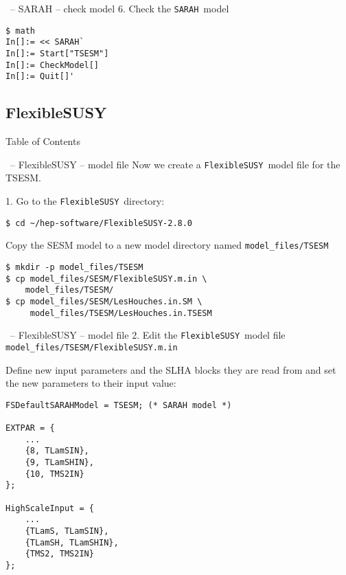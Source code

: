 \documentclass[11pt]{beamer}
\newcommand{\FlexibleSUSY}{\texttt{FlexibleSUSY}}
\newcommand{\SARAH}{\texttt{SARAH}}
\begin{document}

\begin{frame}[fragile]{\insertsection\ -- SARAH -- check model}
  6. Check the \SARAH\ model
  \begin{lstlisting}
$ math
In[]:= << SARAH`
In[]:= Start["TSESM"]
In[]:= CheckModel[]
In[]:= Quit[]'\end{lstlisting}%
\end{frame}


\subsection{FlexibleSUSY}


\begin{frame}{Table of Contents}
\end{frame}


\begin{frame}[fragile]{\insertsection\ -- FlexibleSUSY -- model file}
  Now we create a \FlexibleSUSY\ model file for the TSESM.

  \bigskip

  1. Go to the \FlexibleSUSY\ directory:
  \begin{lstlisting}
$ cd ~/hep-software/FlexibleSUSY-2.8.0\end{lstlisting}%
  Copy the SESM model to a new model directory named
  \texttt{model\_files/TSESM}
  \begin{lstlisting}
$ mkdir -p model_files/TSESM
$ cp model_files/SESM/FlexibleSUSY.m.in \
    model_files/TSESM/
$ cp model_files/SESM/LesHouches.in.SM \
     model_files/TSESM/LesHouches.in.TSESM\end{lstlisting}%
\end{frame}


\begin{frame}[fragile]{\insertsection\ -- FlexibleSUSY -- model file}
  2. Edit the \FlexibleSUSY\ model file
  \texttt{model\_files/TSESM/FlexibleSUSY.m.in}

  \bigskip

  Define new input parameters and the SLHA blocks they are read from
  and set the new parameters to their input value:
  \begin{lstlisting}
FSDefaultSARAHModel = TSESM; (* SARAH model *)

EXTPAR = {
    ...
    {8, TLamSIN},
    {9, TLamSHIN},
    {10, TMS2IN}
};

HighScaleInput = {
    ...
    {TLamS, TLamSIN},
    {TLamSH, TLamSHIN},
    {TMS2, TMS2IN}
};\end{lstlisting}%
\end{frame}
\end{document}

